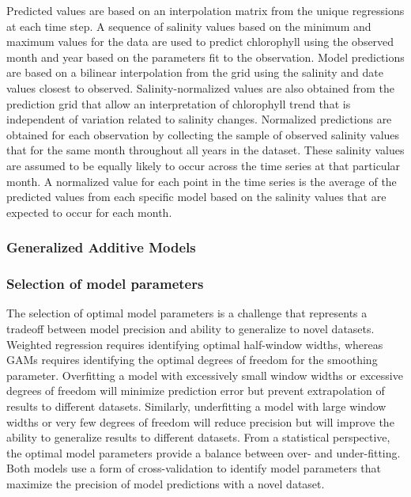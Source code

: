 \documentclass[letterpaper,12pt,oneside]{article}\usepackage[]{graphicx}\usepackage[]{color}
\begin{document}
Predicted values are based on an interpolation matrix from the unique regressions at each time step. A sequence of salinity values based on the minimum and maximum values for the data are used to predict chlorophyll using the observed month and year based on the parameters fit to the observation. Model predictions are based on a bilinear interpolation from the grid using the salinity and date values closest to observed. Salinity-normalized values are also obtained from the prediction grid that allow an interpretation of chlorophyll trend that is independent of variation related to salinity changes. Normalized predictions are obtained for each observation by collecting the sample of observed salinity values that for the same month throughout all years in the dataset.  These salinity values are assumed to be equally likely to occur across the time series at that particular month. A normalized value for each point in the time series is the average of the predicted values from each specific model based on the salinity values that are expected to occur for each month.

\subsubsection{Generalized Additive Models}

\subsubsection{Selection of model parameters}

The selection of optimal model parameters is a challenge that represents a tradeoff between model precision and ability to generalize to novel datasets.  Weighted regression requires identifying optimal half-window widths, whereas \acp{GAM} requires identifying the optimal degrees of freedom for the smoothing parameter.  Overfitting a model with excessively small window widths or excessive degrees of freedom will minimize prediction error but prevent extrapolation of results to different datasets. Similarly, underfitting a model with large window widths or very few degrees of freedom will reduce precision but will improve the ability to generalize results to different datasets. From a statistical perspective, the optimal model parameters provide a balance between over- and under-fitting.  Both models use a form of cross-validation to identify model parameters that maximize the precision of model predictions with a novel dataset.   
\end{document}
